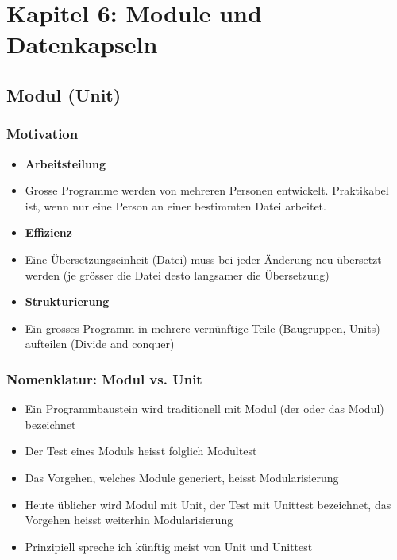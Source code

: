 
\section{Kapitel 6: Module und Datenkapseln\hfill}
\label{sec:Kapitel 6: Module und Datenkapseln}

\subsection{Modul (Unit)\hfill}
\label{sec:Modul (Unit)}

\subsubsection{Motivation\hfill}
\label{sec:Motivation}
\begin{itemize}
	\item \textbf{Arbeitsteilung}
	\item[\-] Grosse Programme werden von mehreren Personen entwickelt. Praktikabel ist, wenn nur eine Person an einer bestimmten Datei arbeitet.
	\item \textbf{Effizienz}
	\item[\-] Eine Übersetzungseinheit (Datei) muss bei jeder Änderung neu übersetzt werden (je grösser die Datei desto langsamer die Übersetzung)
	\item \textbf{Strukturierung}
	\item[\-] Ein grosses  Programm in mehrere vernünftige Teile (Baugruppen, Units) aufteilen (Divide and conquer)
\end{itemize}

\subsubsection{Nomenklatur: Modul vs. Unit\hfill}
\label{sec:Nomenklatur: Modul vs. Unit}
\begin{itemize}
	\item Ein Programmbaustein wird traditionell mit Modul (der oder das Modul) bezeichnet
	\item Der Test eines Moduls heisst folglich Modultest
	\item Das Vorgehen, welches Module generiert, heisst Modularisierung
	\item Heute üblicher wird Modul mit Unit, der Test mit Unittest bezeichnet, das Vorgehen heisst weiterhin Modularisierung
	\item Prinzipiell spreche ich künftig meist von Unit und Unittest
\end{itemize}

